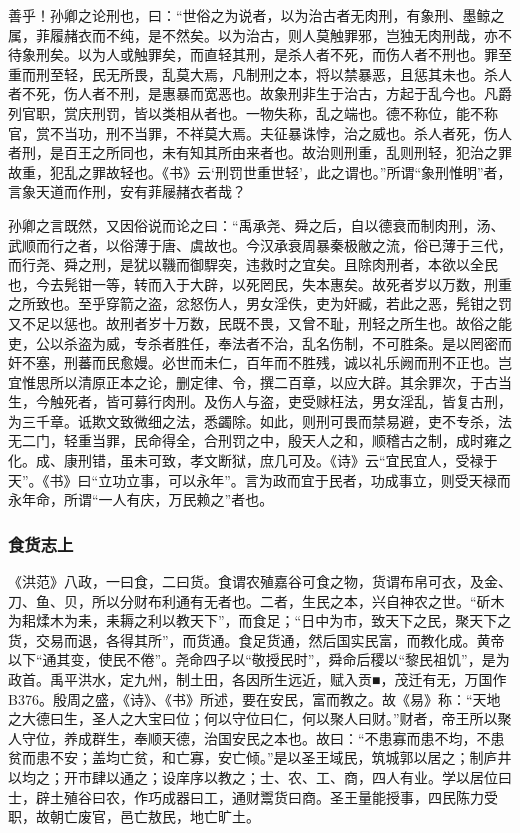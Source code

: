 \documentclass[]{article}
\begin{document}
善乎！孙卿之论刑也，曰：``世俗之为说者，以为治古者无肉刑，有象刑、墨鲸之属，菲履赭衣而不纯，是不然矣。以为治古，则人莫触罪邪，岂独无肉刑哉，亦不待象刑矣。以为人或触罪矣，而直轻其刑，是杀人者不死，而伤人者不刑也。罪至重而刑至轻，民无所畏，乱莫大焉，凡制刑之本，将以禁暴恶，且惩其未也。杀人者不死，伤人者不刑，是惠暴而宽恶也。故象刑非生于治古，方起于乱今也。凡爵列官职，赏庆刑罚，皆以类相从者也。一物失称，乱之端也。德不称位，能不称官，赏不当功，刑不当罪，不祥莫大焉。夫征暴诛悖，治之威也。杀人者死，伤人者刑，是百王之所同也，未有知其所由来者也。故治则刑重，乱则刑轻，犯治之罪故重，犯乱之罪故轻也。《书》云`刑罚世重世轻'，此之谓也。''所谓``象刑惟明''者，言象天道而作刑，安有菲屦赭衣者哉？

孙卿之言既然，又因俗说而论之曰：``禹承尧、舜之后，自以德衰而制肉刑，汤、武顺而行之者，以俗薄于唐、虞故也。今汉承衰周暴秦极敝之流，俗已薄于三代，而行尧、舜之刑，是犹以鞿而御駻突，违救时之宜矣。且除肉刑者，本欲以全民也，今去髡钳一等，转而入于大辟，以死罔民，失本惠矣。故死者岁以万数，刑重之所致也。至乎穿箭之盗，忿怒伤人，男女淫佚，吏为奸臧，若此之恶，髡钳之罚又不足以惩也。故刑者岁十万数，民既不畏，又曾不耻，刑轻之所生也。故俗之能吏，公以杀盗为威，专杀者胜任，奉法者不治，乱名伤制，不可胜条。是以罔密而奸不塞，刑蕃而民愈嫚。必世而未仁，百年而不胜残，诚以礼乐阙而刑不正也。岂宜惟思所以清原正本之论，删定律、令，撰二百章，以应大辟。其余罪次，于古当生，今触死者，皆可募行肉刑。及伤人与盗，吏受赇枉法，男女淫乱，皆复古刑，为三千章。诋欺文致微细之法，悉蠲除。如此，则刑可畏而禁易避，吏不专杀，法无二门，轻重当罪，民命得全，合刑罚之中，殷天人之和，顺稽古之制，成时雍之化。成、康刑错，虽未可致，孝文断狱，庶几可及。《诗》云``宜民宜人，受禄于天''。《书》曰``立功立事，可以永年''。言为政而宜于民者，功成事立，则受天禄而永年命，所谓``一人有庆，万民赖之''者也。

\hypertarget{header-n1590}{%
\subsubsection{食货志上}\label{header-n1590}}

《洪范》八政，一曰食，二曰货。食谓农殖嘉谷可食之物，货谓布帛可衣，及金、刀、鱼、贝，所以分财布利通有无者也。二者，生民之本，兴自神农之世。``斫木为耜煣木为耒，耒耨之利以教天下''，而食足；``日中为市，致天下之民，聚天下之货，交易而退，各得其所''，而货通。食足货通，然后国实民富，而教化成。黄帝以下``通其变，使民不倦''。尧命四子以``敬授民时''，舜命后稷以``黎民祖饥''，是为政首。禹平洪水，定九州，制土田，各因所生远近，赋入贡■，茂迁有无，万国作B376。殷周之盛，《诗》、《书》所述，要在安民，富而教之。故《易》称：``天地之大德曰生，圣人之大宝曰位；何以守位曰仁，何以聚人曰财。''财者，帝王所以聚人守位，养成群生，奉顺天德，治国安民之本也。故曰：``不患寡而患不均，不患贫而患不安；盖均亡贫，和亡寡，安亡倾。''是以圣王域民，筑城郭以居之；制庐井以均之；开市肆以通之；设庠序以教之；士、农、工、商，四人有业。学以居位曰士，辟土殖谷曰农，作巧成器曰工，通财鬻货曰商。圣王量能授事，四民陈力受职，故朝亡废官，邑亡敖民，地亡旷土。
\end{document}
